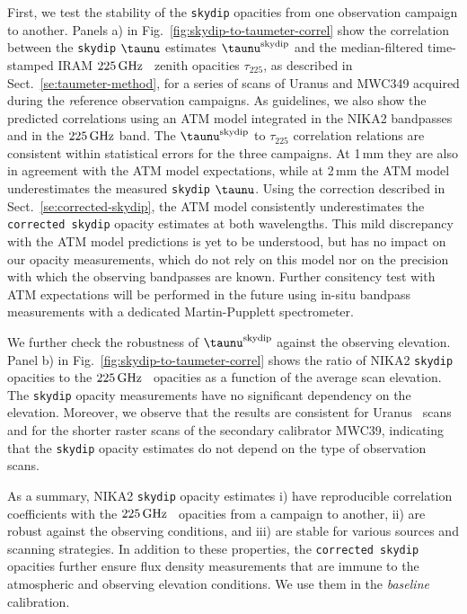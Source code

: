 First, we test the stability of the {\tt skydip} opacities from one
observation campaign to
another. Panels a) in Fig.~\ref{fig:skydip-to-taumeter-correl} show the
correlation between the {\tt skydip} $\taunu$ estimates $\taunu^{\rm{skydip}}$
and the median-filtered time-stamped IRAM $225\,\rm{GHz}$ \taumeter\ 
zenith opacities $\tau_{225}$, as described in
Sect.~\ref{se:taumeter-method}, for a series of scans
of Uranus and MWC349 acquired during the {\emph reference} observation
campaigns. As guidelines,
we also show the predicted correlations using an ATM model integrated
in the NIKA2 bandpasses and in the $225\,\rm{GHz}$ band. {\lp The
$\taunu^{\rm{skydip}}$ to $\tau_{225}$ correlation relations are
consistent within statistical errors for the three campaigns.}
At 1\,mm they are also in agreement with the ATM model expectations,
while at 2\,mm the ATM model underestimates the measured {\tt skydip}
$\taunu$. {\lp Using the correction described in
Sect.~\ref{se:corrected-skydip}, the ATM
model consistently underestimates the {\tt corrected skydip} opacity
estimates at both wavelengths.}
This mild discrepancy with the ATM model predictions is yet to be
understood, but has no impact on
our opacity measurements, which do not rely on this model nor on
the precision with which the observing bandpasses are known. {\lp
Further consitency test with ATM expectations will be performed in the
future using in-situ bandpass measurements with a
dedicated Martin-Pupplett spectrometer.}


We further check the robustness of $\taunu^{\rm{skydip}}$ against the
observing elevation. 
Panel b) in Fig.~\ref{fig:skydip-to-taumeter-correl} shows the ratio of NIKA2
{\tt skydip} opacities to the $225\,\rm{GHz}$ \taumeter\ opacities as a function of
the average scan elevation. The {\tt skydip} opacity measurements have
no significant dependency on the elevation. Moreover, we observe that
the results are consistent for Uranus \bm\ scans and for
the shorter raster scans of the secondary calibrator MWC39, indicating
that the {\tt skydip} opacity estimates do not depend on the type of
observation scans.


As a summary, NIKA2 {\tt skydip} opacity estimates i) have reproducible
correlation coefficients with the $225\,\rm{GHz}$ \taumeter\ opacities from a
campaign to another, ii) are robust against the observing conditions,
and iii) are stable for various sources and scanning strategies. {\lp
In addition to these properties, the {\tt corrected skydip} opacities
further ensure flux density measurements that are immune to the
atmospheric and observing elevation conditions. We use them in
the \emph{baseline} calibration.}


